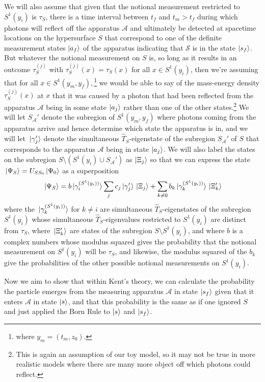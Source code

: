 We will also assume that given that the notional measurement restricted to $S^1(y_i)$ is $\tau_S$, there is a time interval between $t_f$ and $t_m > t_f$ during which photons will reflect off the apparatus $\mathcal{A}$ and ultimately be detected at spacetime locations on the hypersurface $S$ that correspond to one of the definite measurement states $\ket{a_f}$ of the apparatus indicating that $\mathcal{S}$ is in the state $\ket{s_f}$. But whatever the  notional measurement on $S$ is, so long as it results in an outcome $\tau_S^{(j)}$ with $\tau_S^{(j)}(x)=\tau_S(x)$ for all $x\in S^1(y_i)$, then we're assuming that for all $x \in S^1(y_m,y_f),$\footnote{where $y_m=(t_m, z_0)$.} we would be able to say of the mass-energy density $\tau_S^{(j)}(x)$ at $x$ that it was caused by a photon that had been reflected from the apparatus $\mathcal{A}$ being in some state $\ket{a_j}$ rather than one of the other states.\footnote{This is again an assumption of our toy model, so it may not be true in more realistic models where there are many more object off which photons could reflect.} We will let $S_{\mathcal{A}}'$ denote the subregion of $S^1(y_m,y_f)$ where photons coming from the apparatus arrive and hence determine which state the apparatus  is in, and we will let $\ket*{\gamma'_j}$ denote the simultaneous $\hat{T}_S$-eigenstate of the subregion $S_{\mathcal{A}}'$ of $S$ that corresponds to the apparatus $\mathcal{A}$ being in state $\ket{a_j}$.  We will also label the states on the subregion $S\setminus (S^1(y_i)\cup S_{\mathcal{A}}')$ as $\ket{\Xi_j}$ so that we can express the state $\ket*{\Psi_S}=U_{SS_0}\ket*{\Psi_0}$ as a superposition
\begin{equation}\label{PsiSdecomp}
\ket*{\Psi_S}=b\ket*{\gamma_i^{(S^1(y_i))}}\sum_j c_j \ket*{\gamma_j'}\ket*{\Xi_j} +\sum_{k\neq 0} b_k\ket*{\gamma_k^{(S^1(y_i))}}\ket*{\Xi_k'}
\end{equation}
where the $\ket*{\gamma_k^{(S^1(y_i))}}$ for $k\neq i$ are simultaneous $\hat{T}_S$-eigenstates of the subregion $S^1(y_i)$ whose simultaneous $\hat{T}_S$-eigenvalues restricted to $S^1(y_i)$ are distinct from $\tau_S$, where $\ket*{\Xi_k'}$ are states of the subregion $S\setminus S^1(y_i)$, and where $b$  is a complex numbers whose modulus squared gives the probability that the notional measurement on $S^1(y_i)$ will be $\tau_S$, and likewise, the modulus squared of the $b_k$ give the probabilities of the other possible notional measurements on $S^1(y_i).$ 

Now we aim to show that within Kent's theory, we can calculate the probability the particle emerges from the measuring apparatus $\mathcal{A}$ in state $\ket{s_{f}}$ given that it enters $\mathcal{A}$ in state $\ket{s}$, and that this probability is the same as if one ignored $S$ and just applied the Born Rule to $\ket{s}$ and $\ket{s_f}$. 

